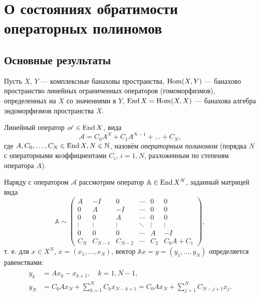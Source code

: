 \chapter{О состояниях обратимости операторных полиномов}
\section{Основные результаты}
Пусть $X$, $Y$ --- комплексные банаховы пространства, $\operatorname{Hom}(X, Y)$ --- банахово пространство линейных ограниченных операторов (гомоморфизмов), определенных на $X$ со значениями в $Y$, $\operatorname{End} X = \operatorname{Hom}(X, X)$ --- банахова алгебра эндоморфизмов пространства $X$.

Линейный оператор $ \mathcal A \in \operatorname{End} X$, вида
\[  \mathcal A = C_0 A^N + C_1 A^{N - 1} + \dotsc + C_N, \]
где $A, C_0, \dotsc, C_N \in \operatorname{End} X, N \in \mathbb{N}$, назовём \emph{операторным полиномом} (порядка $N$ с операторными коэффициентами $C_i$, $i = \overline{1,N}$, разложенным по степеням оператора $A$).

Наряду с оператором $\mathcal A$ рассмотрим оператор $\mathbb A \in \operatorname{End} X^{N}$, заданный матрицей вида
\[ \mathbb A \sim
    \begin{pmatrix}
    A & -I & 0  & \cdots & 0 & 0 \\
    0 & A  & -I & \cdots & 0 & 0 \\
    0 & 0  & A & \cdots & 0 & 0 \\
    \vdots & \vdots & \vdots & \ddots & \vdots & \vdots \\
    0 & 0 & 0 & \cdots & A & -I \\
    C_N & C_{N-1} & C_{N-2} & \cdots & C_2 & C_0 A + C_1
   \end{pmatrix}, \]
т. е. для $x \in X^{N}$, $x = (x_1, \dotsc, x_{N})$, вектор $\mathbb A x = y = (y_1, \dotsc, y_{N})$ определяется равенствами:
\begin{align*}
    y_k &= Ax_k - x_{k + 1}, \quad k = \overline{1,N-1}, \\
    y_{N} &= C_0 A x_N + \sum_{k = 1}^{N} C_k x_{N - k + 1} = C_0 A x_N + \sum_{j = 1}^{N} C_{N - j + 1} x_{j}.
\end{align*}

